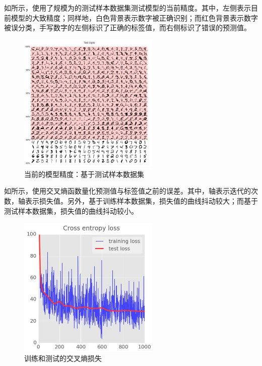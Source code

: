 \begin{content}
\begin{content}
如所示，使用了规模为的测试样本数据集测试模型的当前精度。其中，左侧表示目前模型的大致精度；同样地，白色背景表示数字被正确识别；而红色背景表示数字被误分类，手写数字的左侧标识了正确的标签值，而右侧标识了错误的预测值。

\begin{figure}[H]
\centering
\includegraphics[width=0.6\textwidth]{figures/mnist-test-digits.jpeg}
\caption{当前的模型精度：基于测试样本数据集}
 \label{fig:mnist-test-digits}
\end{figure}

如所示，使用交叉熵函数量化预测值与标签值之前的误差。其中，轴表示迭代的次数，轴表示损失值。另外，基于训练样本数据集，损失值的曲线抖动较大；而基于测试样本数据集，损失值的曲线抖动较小。

\begin{figure}[H]
\centering
\includegraphics[width=0.6\textwidth]{figures/mnist-cross-entropy-loss-fig.jpeg}
\caption{训练和测试的交叉熵损失}
 \label{fig:mnist-cross-entropy-loss-fig}
\end{figure}


\end{content}
\end{content}
